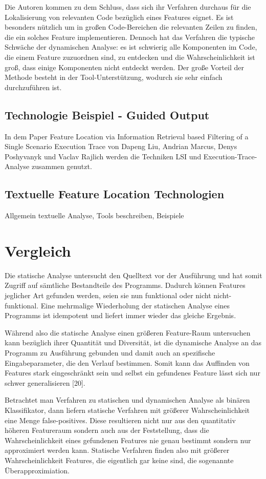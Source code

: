 \documentclass[runningheads,a4paper]{llncs}
\begin{document}
Die Autoren kommen zu dem Schluss, dass sich ihr Verfahren durchaus für die Lokalisierung von relevanten Code bezüglich eines Features eignet. Es ist besonders nützlich um in großen Code-Bereichen die relevanten Zeilen zu finden, die ein solches Feature implementieren. Dennoch hat das Verfahren die typische Schwäche der dynamischen Analyse: es ist schwierig alle Komponenten im Code, die einem Feature zuzuordnen sind, zu entdecken und die Wahrscheinlichkeit ist groß, dass einige Komponenten nicht entdeckt werden. Der große Vorteil der Methode besteht in der Tool-Unterstützung, wodurch sie sehr einfach durchzuführen ist. 

\subsection*{Technologie Beispiel - Guided Output}
In dem Paper Feature Location via Information Retrieval based Filtering of a Single Scenario Execution Trace von Dapeng Liu, Andrian Marcus, Denys Poshyvanyk und Vaclav Rajlich werden die Techniken LSI und Execution-Trace-Analyse zusammen genutzt. 

\subsection{Textuelle Feature Location Technologien}
Allgemein textuelle Analyse, Tools beschreiben, Beispiele

\section{Vergleich}
Die statische Analyse untersucht den Quelltext vor der Ausführung und hat somit Zugriff auf sämtliche Bestandteile des Programms. Dadurch können Features
jeglicher Art gefunden werden, seien sie nun funktional oder nicht nicht-funktional. Eine mehrmalige Wiederholung der statischen Analyse eines
Programms ist idempotent und liefert immer wieder das gleiche Ergebnis.

Während also die statische Analyse einen größeren Feature-Raum untersuchen kann bezüglich ihrer Quantität und Diversität, ist die dynamische
Analyse an das Programm zu Ausführung gebunden und damit auch an spezifische Eingabeparameter, die den Verlauf bestimmen. Somit kann das Auffinden
von Features stark eingeschränkt sein und selbst ein gefundenes Feature lässt sich nur schwer generalisieren [20].

Betrachtet man Verfahren zu statischen und dynamischen Analyse als binären Klassifikator, dann liefern statische Verfahren mit größerer 
Wahrscheinlichkeit eine Menge false-positives. Diese resultieren nicht nur aus den quantitativ höheren Featureraum sondern auch aus
der Feststellung, dass die Wahrscheinlichkeit eines gefundenen Features nie genau bestimmt sondern nur approximiert werden kann. Statische
Verfahren finden also mit größerer Wahrscheinlichkeit Features, die eigentlich gar keine sind, die sogenannte Überapproximiation.
\end{document}
